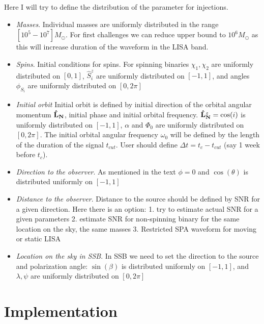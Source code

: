 \documentclass[11pt]{report}
\def\bL{{\bf \hat{L}_{N}}}
\begin{document}
Here I will try to define the distribution of the parameter for injections.
\begin{itemize}

\item {\it Masses}. Individual masses are uniformly distributed in the range
$[10^5 - 10^{7}]M_{\odot}$. For first challenges we can reduce upper bound to
$10^6M_{\odot}$ as this will increase duration of the waveform in the LISA band.

\item {\it Spins}. Initial conditions for spins. 
For spinning binaries $\chi_1,\chi_2$ are uniformly distributed
on $[0,1]$, $\hat{S}_i^z$ are uniformly distributed on $[-1,1]$, and angles
$\phi_{S_i}$ are uniformly distributed on $[0,2\pi]$

\item {\it Initial orbit} Initial orbit is defined by initial direction
of the orbital angular momentum $\bL$, initial phase and initial orbital frequency.
$\bL^z = \cos(i)$ is uniformly distributed on $[-1,1]$, $\alpha$ and $\Phi_0$ are uniformly
distributed on $[0,2\pi]$. The initial orbital angular frequency $\omega_0$ 
will be defined by the length of the duration of the signal $t_{cut}$. User should define 
$\Delta t = t_c - t_{cut}$ (say 1 week before $t_c$).

\item {\it Direction to the observer}. As mentioned in the text $\phi=0$ and
$\cos(\theta)$ is distributed uniformly on $[-1,1]$

\item {\it Distance to the observer}. Distance to the source should be defined
by SNR for a given direction. Here there is an option: 1. try to estimate actual
SNR for a given parameters 2. estimate SNR for non-spinning binary for the same
location on the sky, the same masses 3. Restricted SPA waveform for moving or
static LISA

\item {\it Location on the sky in SSB}. In SSB we need to set the direction to the source
and polarization angle: $\sin(\beta)$ is distributed uniformly on $[-1,1]$, and
$\lambda, \psi$ are uniformly distributed on $[0,2\pi]$

\end{itemize}

\section{Implementation}
\end{document}
